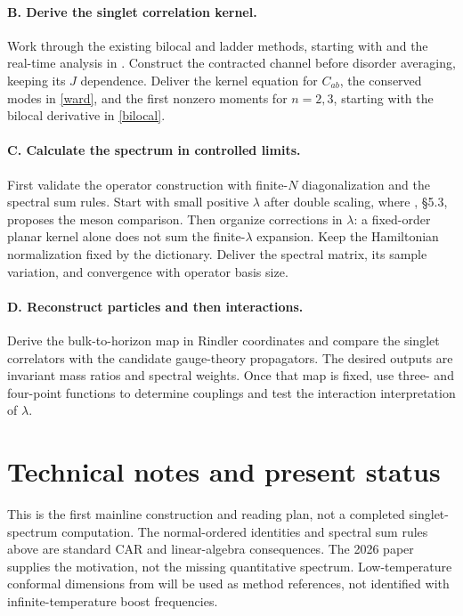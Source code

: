 \documentclass[11pt,a4paper]{article}
\begin{document}
\paragraph{B. Derive the singlet correlation kernel.}
Work through the existing bilocal and ladder methods, starting with
\cite{gr} and the real-time analysis in \cite{qcd}. Construct the
contracted channel before disorder averaging, keeping its $J$ dependence.
Deliver the kernel equation for $C_{ab}$, the conserved modes in
\eqref{ward}, and the first nonzero moments for $n=2,3$, starting with
the bilocal derivative in \eqref{bilocal}.

\paragraph{C. Calculate the spectrum in controlled limits.}
First validate the operator construction with finite-$N$ diagonalization
and the spectral sum rules. Start with small positive $\lambda$ after
double scaling, where \cite{mss25}, \S5.3, proposes the meson comparison.
Then organize corrections in $\lambda$: a fixed-order planar kernel
alone does not sum the finite-$\lambda$ expansion. Keep the Hamiltonian
normalization fixed by the dictionary. Deliver the spectral matrix,
its sample variation, and convergence with operator basis size.

\paragraph{D. Reconstruct particles and then interactions.}
Derive the bulk-to-horizon map in Rindler coordinates and compare the
singlet correlators with the candidate gauge-theory propagators. The
desired outputs are invariant mass ratios and spectral weights. Once
that map is fixed, use three- and four-point functions to determine
couplings and test the interaction interpretation of $\lambda$.

\appendix
\section{Technical notes and present status}
This is the first mainline construction and reading plan, not a completed
singlet-spectrum computation. The normal-ordered identities and spectral
sum rules above are standard CAR and linear-algebra consequences.
The 2026 paper supplies the motivation, not the missing quantitative
spectrum. Low-temperature conformal dimensions from \cite{gr} will be
used as method references, not identified with infinite-temperature
boost frequencies.
\end{document}
